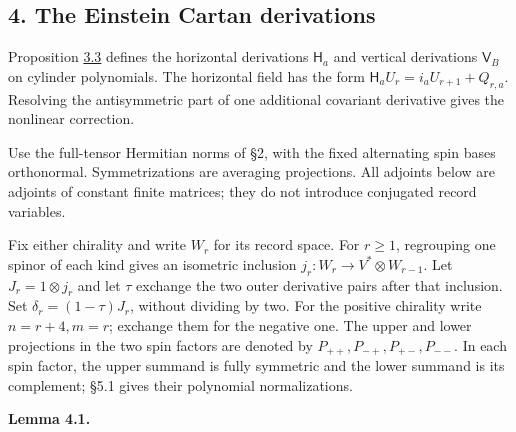 \documentclass[
  english,
  11pt,
  reqno]{amsart}
\makeatletter
\newcommand{\pandocstatementheading}[1]{%
  \par\addpenalty{\@beginparpenalty}%
  \addvspace{.5\baselineskip plus .2\baselineskip minus .2\baselineskip}%
  {\normalfont\bfseries #1\par}%
  \nobreak\@afterindenttrue\@afterheading
}
\makeatother
\begin{document}
\protect{}\label{sec:es-derivations}

\subsection{4. The Einstein Cartan
derivations}\label{the-einstein-cartan-derivations}

Proposition \hyperref[prop:es-polynomial-derivations]{3.3} defines the
horizontal derivations \(\mathsf H_a\) and vertical derivations
\(\mathsf V_B\) on cylinder polynomials. The horizontal field has the
form \(\mathsf H_aU_r=i_aU_{r+1}+Q_{r,a}\). Resolving the antisymmetric
part of one additional covariant derivative gives the nonlinear
correction.

Use the full-tensor Hermitian norms of §2, with the fixed alternating
spin bases orthonormal. Symmetrizations are averaging projections. All
adjoints below are adjoints of constant finite matrices; they do not
introduce conjugated record variables.

Fix either chirality and write \(W_r\) for its record space. For
\(r\ge1\), regrouping one spinor of each kind gives an isometric
inclusion \(j_r:W_r\to V^*\otimes W_{r-1}\). Let \(J_r=1\otimes j_r\)
and let \(\tau\) exchange the two outer derivative pairs after that
inclusion. Set \(\delta_r=(1-\tau)J_r\), without dividing by two. For
the positive chirality write \(n=r+4,m=r\); exchange them for the
negative one. The upper and lower projections in the two spin factors
are denoted by \(P_{++},P_{-+},P_{+-},P_{--}\). In each spin factor, the
upper summand is fully symmetric and the lower summand is its
complement; §5.1 gives their polynomial normalizations.

\pandocstatementheading{\protect{}\label{lem:es-spencer}Lemma 4.1.}
\end{document}
